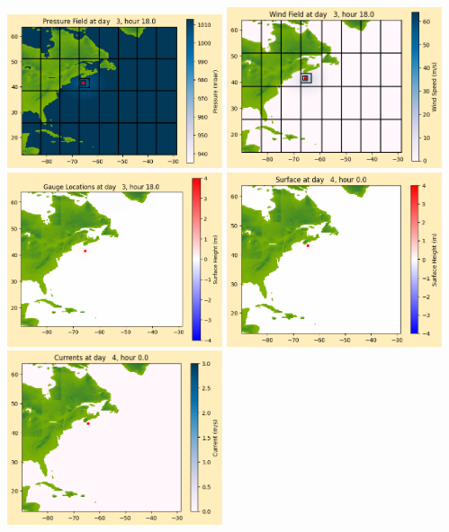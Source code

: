 \documentclass[11pt]{article}
\begin{document}
\includegraphics[width=0.475\textwidth]{frame0027fig1012.png}
\vskip 10pt 
\includegraphics[width=0.475\textwidth]{frame0027fig1013.png}
\includegraphics[width=0.475\textwidth]{frame0027fig1014.png}
\vskip 10pt 
\includegraphics[width=0.475\textwidth]{frame0028fig1001.png}
\includegraphics[width=0.475\textwidth]{frame0028fig1002.png}
\end{document}
